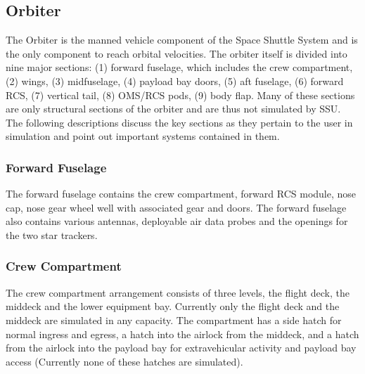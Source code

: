 \documentclass[13pt]{article}
\begin{document}
\begin{multicols}{2}
\subsection{\large Orbiter}
\localtableofcontents

The Orbiter is the manned vehicle component of the Space Shuttle System and is the only component to reach orbital velocities.  The orbiter itself is divided into nine major sections: (1) forward fuselage, which includes the crew compartment, (2) wings, (3) midfuselage, (4) payload bay doors, (5) aft fuselage, (6) forward RCS, (7) vertical tail, (8) OMS/RCS pods, (9) body flap.  Many of these sections are only structural sections of the orbiter and are thus not simulated by SSU. The following descriptions discuss the key sections as they pertain to the user in simulation and point out important systems contained in them.


\subsubsection{Forward Fuselage}
The forward fuselage contains the crew compartment, forward RCS module, nose cap, nose gear wheel well with associated gear and doors.  The forward fuselage also contains various antennas, deployable air data probes and the openings for the two star trackers.
\\

\subsubsection{Crew Compartment}
The crew compartment arrangement consists of three levels, the flight deck, the middeck and the lower equipment bay. Currently only the flight deck and the middeck are simulated in any capacity. The compartment has a side hatch for normal ingress and egress, a hatch into the airlock from the middeck, and a hatch from the airlock into the payload bay for extravehicular activity and payload bay access (Currently none of these hatches are simulated).

\end{multicols}
\end{document}
